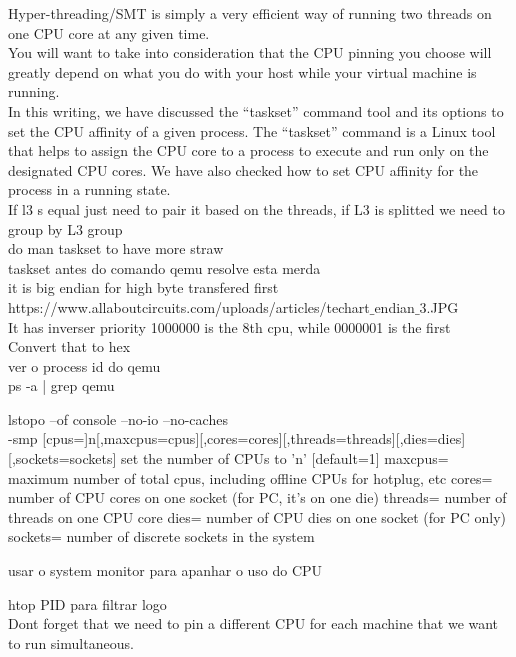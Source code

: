 \documentclass[11pt, a4paper, oneside]{article}
\theoremstyle{definition}
\begin{document}
Hyper-threading/SMT is simply a very efficient way of running two threads on one CPU core at any given time.\\
You will want to take into consideration that the CPU pinning you choose will greatly depend on what you do with your host while your virtual machine is running. \\

In this writing, we have discussed the “taskset” command tool and its options to set the CPU affinity of a given process. The “taskset” command is a Linux tool that helps to assign the CPU core to a process to execute and run only on the designated CPU cores. We have also checked how to set CPU affinity for the process in a running state.\\

If l3 s equal just need to pair it based on the threads, if L3 is splitted we need to group by L3 group\\
do man taskset to have more straw\\
taskset antes do comando qemu resolve esta merda\\
it is big endian for high byte transfered first\\
https://www.allaboutcircuits.com/uploads/articles/techart$\_$endian$\_$3.JPG\\
It has inverser priority 1000000 is the 8th cpu, while 0000001 is the first\\
Convert that to hex\\

ver o process id do qemu \\
ps -a | grep qemu

lstopo --of console --no-io --no-caches\\

-smp [cpus=]n[,maxcpus=cpus][,cores=cores][,threads=threads][,dies=dies][,sockets=sockets]
                set the number of CPUs to 'n' [default=1]
                maxcpus= maximum number of total cpus, including
                offline CPUs for hotplug, etc
                cores= number of CPU cores on one socket (for PC, it's on one die)
                threads= number of threads on one CPU core
                dies= number of CPU dies on one socket (for PC only)
                sockets= number of discrete sockets in the system

usar o system monitor para apanhar o uso do CPU

htop PID para filtrar logo \\

Dont forget that we need to pin a different CPU for each machine that we want to run simultaneous.\\
\end{document}
